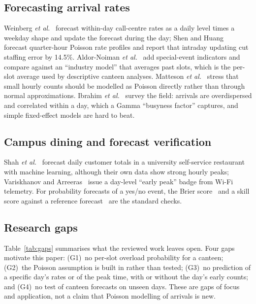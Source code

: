 \documentclass[conference,a4paper]{IEEEtran}
\begin{document}
\subsection{Forecasting arrival rates}
Weinberg \textit{et al.}~\cite{weinberg2007} forecast within-day call-centre rates as a daily level times a weekday
shape and update the forecast during the day; Shen and Huang~\cite{shen2008} forecast quarter-hour Poisson rate
profiles and report that intraday updating cut staffing error by 14.5\%. Aldor-Noiman \textit{et al.}~\cite{aldornoiman2009}
add special-event indicators and compare against an ``industry model'' that averages past slots, which is the
per-slot average used by descriptive canteen analyses. Matteson \textit{et al.}~\cite{matteson2011} stress that small
hourly counts should be modelled as Poisson directly rather than through normal approximations. Ibrahim
\textit{et al.}~\cite{ibrahim2016} survey the field: arrivals are overdispersed and correlated within a day, which a
Gamma ``busyness factor'' captures, and simple fixed-effect models are hard to beat.

\subsection{Campus dining and forecast verification}
Shah \textit{et al.}~\cite{shah2025} forecast daily customer totals in a university self-service restaurant with
machine learning, although their own data show strong hourly peaks; Variskhanov and Arreeras~\cite{variskhanov2026}
issue a day-level ``early peak'' badge from Wi-Fi telemetry. For probability forecasts of a yes/no event, the Brier
score~\cite{brier1950} and a skill score against a reference forecast~\cite{mcnulty1988} are the standard checks.

\subsection{Research gaps}
Table~\ref{tab:gaps} summarises what the reviewed work leaves open. Four gaps motivate this paper:
(G1)~no per-slot overload probability for a canteen; (G2)~the Poisson assumption is built in rather than tested;
(G3)~no prediction of a specific day's rates or of the peak time, with or without the day's early counts; and
(G4)~no test of canteen forecasts on unseen days. These are gaps of focus and application, not a claim that Poisson
modelling of arrivals is new.
\end{document}
